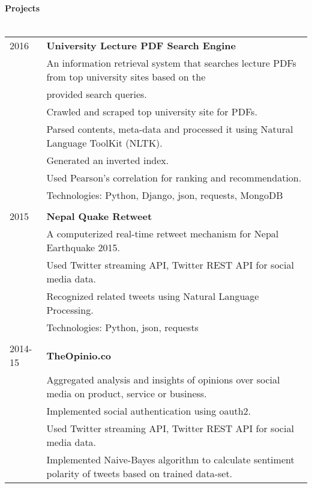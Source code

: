 \documentclass[letterpaper,10pt,oneside]{article}
\newcommand{\nextitem}{\par\hspace*{\labelsep}\textbullet\hspace*{\labelsep}}
\begin{document}
\paragraph{\large{Projects}\\\\}
\noindent \begin{tabular}{l l}
 2016    & \textbf{University Lecture PDF Search Engine} \\
         & An information retrieval system that searches lecture PDFs from top university sites based on the \\
         & provided search queries. \\
         & \footnotesize{\nextitem Crawled and scraped top university site for PDFs.} \\
         & \footnotesize{\nextitem Parsed contents, meta-data and processed it using Natural Language ToolKit (NLTK).} \\
         & \footnotesize{\nextitem Generated an inverted index.} \\
         & \footnotesize{\nextitem Used Pearson's correlation for ranking and recommendation.} \\
         & Technologies: Python, Django, json, requests, MongoDB \\
         \\
 2015    & \textbf{Nepal Quake Retweet} \\
         & A computerized real-time retweet mechanism for Nepal Earthquake 2015. \\
         & \footnotesize{\nextitem  Used Twitter streaming API, Twitter REST API for social media data.} \\
         & \footnotesize{\nextitem Recognized related tweets using Natural Language Processing.} \\
         & Technologies: Python, json, requests \\
         \\
 2014-15 & \textbf{TheOpinio.co} \\
         & Aggregated analysis and insights of opinions over social media on product, service or business. \\
         & \footnotesize{\nextitem  Implemented social authentication using oauth2.} \\
         & \footnotesize{\nextitem  Used Twitter streaming API, Twitter REST API for social media data.} \\
         & \footnotesize{\nextitem Implemented Naive-Bayes algorithm to calculate sentiment polarity of tweets based on trained data-set.} \\

\end{tabular}
\end{document}
